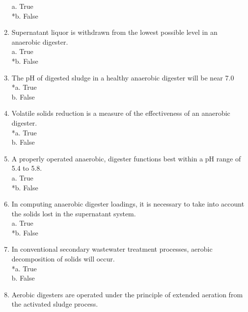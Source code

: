 \documentclass{article}
\begin{document}
\begin{enumerate}
a. True \\
*b. False \\

\item  Supernatant liquor is withdrawn from the lowest possible level in an anaerobic digester. \\

a. True \\
*b. False \\

\item  The pH of digested sludge in a healthy anaerobic digester will be near 7.0 \\

*a. True \\
b. False \\

\item  Volatile solids reduction is a measure of the effectiveness of an anaerobic digester. \\

*a. True \\
b. False \\

\item  A properly operated anaerobic, digester functions best within a pH range of 5.4 to 5.8. \\

a. True \\
*b. False \\

\item  In computing anaerobic digester loadings, it is necessary to take into account the solids lost in the supernatant system. \\

a. True \\
*b. False \\

\item  In conventional secondary wastewater treatment processes, aerobic decomposition of solids will occur. \\

*a. True \\
b. False \\

\item  Aerobic digesters are operated under the principle of extended aeration from the activated sludge process. \\


\end{enumerate}
\end{document}
